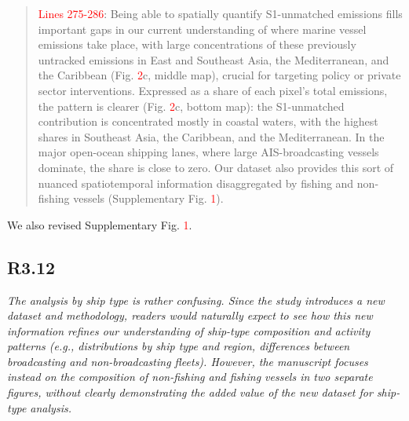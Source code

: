 \documentclass[11pt]{article}
\newcommand{\point}[1]{\subsection*{\normalfont\bfseries #1}}
\begin{document}
\begin{quote}
\textcolor{red}{Lines 275-286}: Being able to spatially quantify S1-unmatched emissions fills important gaps in our current understanding of where marine vessel emissions take place, with large concentrations of these previously untracked emissions in East and Southeast Asia, the Mediterranean, and the Caribbean (Fig. \textcolor{red}{2}c, middle map), crucial for targeting policy or private sector interventions. Expressed as a share of each pixel's total emissions, the pattern is clearer (Fig. \textcolor{red}{2}c, bottom map): the S1-unmatched contribution is concentrated mostly in coastal waters, with the highest shares in Southeast Asia, the Caribbean, and the Mediterranean. In the major open-ocean shipping lanes, where large AIS-broadcasting vessels dominate, the share is close to zero. Our dataset also provides this sort of nuanced spatiotemporal information disaggregated by fishing and non-fishing vessels (Supplementary Fig. \textcolor{red}{1}).
\end{quote}

We also revised Supplementary Fig. \textcolor{red}{1}.

\point{R3.12}

\begin{refquote}\itshape
The analysis by ship type is rather confusing. Since the study introduces a new
dataset and methodology, readers would naturally expect to see how this new
information refines our understanding of ship-type composition and activity
patterns (e.g., distributions by ship type and region, differences between
broadcasting and non-broadcasting fleets). However, the manuscript focuses
instead on the composition of non-fishing and fishing vessels in two separate
figures, without clearly demonstrating the added value of the new dataset for
ship-type analysis.
\end{refquote}
\end{document}
